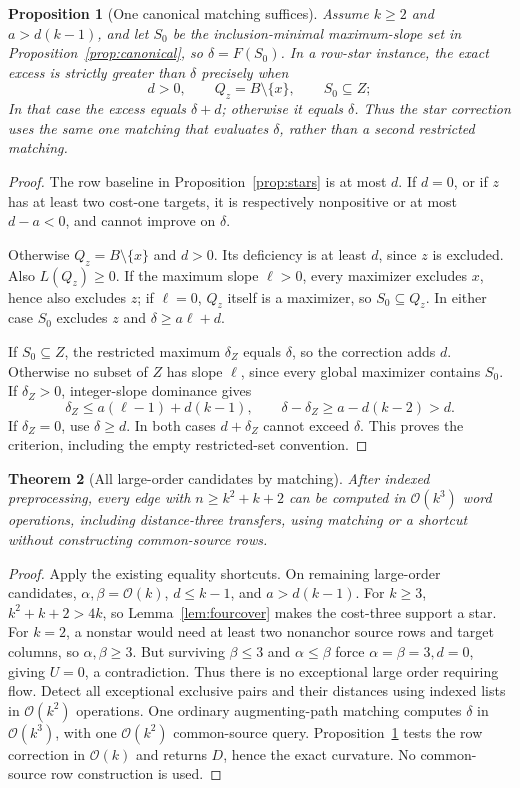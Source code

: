 \documentclass[11pt]{article}
\newtheorem{theorem}{Theorem}[section]
\newtheorem{proposition}[theorem]{Proposition}
\theoremstyle{remark}
\newcommand{\Oh}{\mathcal O}
\begin{document}
\begin{proposition}[One canonical matching suffices]\label{prop:single}
Assume $k\ge2$ and $a>d(k-1)$, and let $S_0$ be the inclusion-minimal maximum-slope set in Proposition~\ref{prop:canonical}, so $\delta=F(S_0)$. In a row-star instance, the exact excess is strictly greater than $\delta$ precisely when
\[
 d>0,\qquad Q_z=B\setminus\{x\},\qquad S_0\subseteq Z;
\]
In that case the excess equals $\delta+d$; otherwise it equals $\delta$. Thus the star correction uses the same one matching that evaluates $\delta$, rather than a second restricted matching.
\end{proposition}
\begin{proof}
The row baseline in Proposition~\ref{prop:stars} is at most $d$. If $d=0$, or if $z$ has at least two cost-one targets, it is respectively nonpositive or at most $d-a<0$, and cannot improve on $\delta$.

Otherwise $Q_z=B\setminus\{x\}$ and $d>0$. Its deficiency is at least $d$, since $z$ is excluded. Also $L(Q_z)\ge0$. If the maximum slope $\ell>0$, every maximizer excludes $x$, hence also excludes $z$; if $\ell=0$, $Q_z$ itself is a maximizer, so $S_0\subseteq Q_z$. In either case $S_0$ excludes $z$ and $\delta\ge a\ell+d$.

If $S_0\subseteq Z$, the restricted maximum $\delta_Z$ equals $\delta$, so the correction adds $d$. Otherwise no subset of $Z$ has slope $\ell$, since every global maximizer contains $S_0$. If $\delta_Z>0$, integer-slope dominance gives
\[
 \delta_Z\le a(\ell-1)+d(k-1),\qquad
 \delta-\delta_Z\ge a-d(k-2)>d.
\]
If $\delta_Z=0$, use $\delta\ge d$. In both cases $d+\delta_Z$ cannot exceed $\delta$. This proves the criterion, including the empty restricted-set convention.
\end{proof}

\begin{theorem}[All large-order candidates by matching]\label{thm:star}
After indexed preprocessing, every edge with $n\ge k^2+k+2$ can be computed in $\Oh(k^3)$ word operations, including distance-three transfers, using matching or a shortcut without constructing common-source rows.
\end{theorem}
\begin{proof}
Apply the existing equality shortcuts. On remaining large-order candidates, $\alpha,\beta=\Oh(k)$, $d\le k-1$, and $a>d(k-1)$. For $k\ge3$, $k^2+k+2>4k$, so Lemma~\ref{lem:fourcover} makes the cost-three support a star. For $k=2$, a nonstar would need at least two nonanchor source rows and target columns, so $\alpha,\beta\ge3$. But surviving $\beta\le3$ and $\alpha\le\beta$ force $\alpha=\beta=3,d=0$, giving $U=0$, a contradiction. Thus there is no exceptional large order requiring flow. Detect all exceptional exclusive pairs and their distances using indexed lists in $\Oh(k^2)$ operations. One ordinary augmenting-path matching computes $\delta$ in $\Oh(k^3)$, with one $\Oh(k^2)$ common-source query. Proposition~\ref{prop:single} tests the row correction in $\Oh(k)$ and returns $D$, hence the exact curvature. No common-source row construction is used.
\end{proof}
\end{document}
